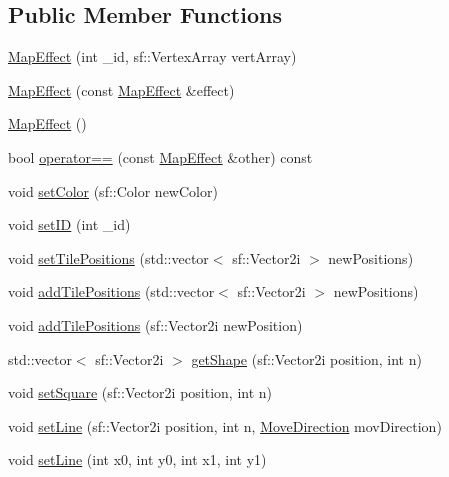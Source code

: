 \subsection*{Public Member Functions}
\begin{DoxyCompactItemize}
\item 
\mbox{\hyperlink{class_map_effect_ac517bf5e557ac443b45a1dedb2b216ab}{Map\+Effect}} (int \+\_\+id, sf\+::\+Vertex\+Array vert\+Array)
\item 
\mbox{\hyperlink{class_map_effect_aff543fedf91ca1798942f756c8388aa3}{Map\+Effect}} (const \mbox{\hyperlink{class_map_effect}{Map\+Effect}} \&effect)
\item 
\mbox{\hyperlink{class_map_effect_aa271c0e92d24c599620890409a7a0de6}{Map\+Effect}} ()
\item 
bool \mbox{\hyperlink{class_map_effect_a4782568b5d45629c080fdf183943ea29}{operator==}} (const \mbox{\hyperlink{class_map_effect}{Map\+Effect}} \&other) const
\item 
void \mbox{\hyperlink{class_map_effect_a099bb0a933606b5fb24e0eb91a9f78b6}{set\+Color}} (sf\+::\+Color new\+Color)
\item 
void \mbox{\hyperlink{class_map_effect_a7945a4888b4f7d3d14990beac98d6b46}{set\+ID}} (int \+\_\+id)
\item 
void \mbox{\hyperlink{class_map_effect_af79dd085aefbd1cdd92e9e9aa695592a}{set\+Tile\+Positions}} (std\+::vector$<$ sf\+::\+Vector2i $>$ new\+Positions)
\item 
void \mbox{\hyperlink{class_map_effect_a241e9bc24e9ded3426acedb2a36bc15b}{add\+Tile\+Positions}} (std\+::vector$<$ sf\+::\+Vector2i $>$ new\+Positions)
\item 
void \mbox{\hyperlink{class_map_effect_aa3ede6caaa085ad57f7cc5be0b143ca2}{add\+Tile\+Positions}} (sf\+::\+Vector2i new\+Position)
\item 
std\+::vector$<$ sf\+::\+Vector2i $>$ \mbox{\hyperlink{class_map_effect_a4557d94941b97471dce7ac47e30825c5}{get\+Shape}} (sf\+::\+Vector2i position, int n)
\item 
void \mbox{\hyperlink{class_map_effect_a4c382be68e0b9dae8fb1f216c8cfc9a6}{set\+Square}} (sf\+::\+Vector2i position, int n)
\item 
void \mbox{\hyperlink{class_map_effect_a4f2bfbdac42379cf0206216a52441c1a}{set\+Line}} (sf\+::\+Vector2i position, int n, \mbox{\hyperlink{_enum_types_8hpp_a00ec4eba48da32d6cbdf827185fd3d34}{Move\+Direction}} mov\+Direction)
\item 
void \mbox{\hyperlink{class_map_effect_ac927f830b816bcf14d594db3c1d1e100}{set\+Line}} (int x0, int y0, int x1, int y1)

\end{DoxyCompactItemize}
